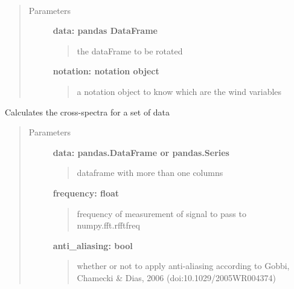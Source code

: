 \documentclass[a4paper,10pt,english]{sphinxmanual}
\begin{document}
\begin{fulllineitems}
\label{pymicra:pymicra.data.rotate2D}~\begin{quote}\begin{description}
\item[{Parameters}] \leavevmode
\textbf{data: pandas DataFrame}
\begin{quote}

the dataFrame to be rotated
\end{quote}

\textbf{notation: notation object}
\begin{quote}

a notation object to know which are the wind variables
\end{quote}

\end{description}\end{quote}

\end{fulllineitems}


\begin{fulllineitems}
\label{pymicra:pymicra.data.spectra}
Calculates the cross-spectra for a set of data
\begin{quote}\begin{description}
\item[{Parameters}] \leavevmode
\textbf{data: pandas.DataFrame or pandas.Series}
\begin{quote}

dataframe with more than one columns
\end{quote}

\textbf{frequency: float}
\begin{quote}

frequency of measurement of signal to pass to numpy.fft.rfftfreq
\end{quote}

\textbf{anti\_aliasing: bool}
\begin{quote}

whether or not to apply anti-aliasing according to Gobbi, Chamecki \& Dias, 2006 (doi:10.1029/2005WR004374)
\end{quote}

\end{description}\end{quote}

\end{fulllineitems}
\end{document}
